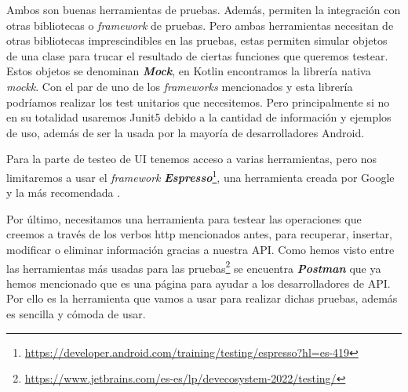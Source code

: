 Ambos son buenas herramientas de pruebas. Además, permiten la integración con otras bibliotecas o \textit{framework} de pruebas. Pero ambas herramientas necesitan de otras bibliotecas imprescindibles en las pruebas, estas permiten simular objetos de una clase para trucar el resultado de ciertas funciones que queremos testear. Estos objetos se denominan \textbf{\textit{Mock}}, en Kotlin encontramos la librería nativa \textit{mockk}. Con el par de uno de los \textit{frameworks} mencionados y esta librería podríamos realizar los test unitarios que necesitemos. Pero principalmente si no en su totalidad usaremos Junit5 debido a la cantidad de información y ejemplos de uso, además de ser la usada por la mayoría de desarrolladores Android.

Para la parte de testeo de UI tenemos acceso a varias herramientas, pero nos limitaremos a usar el \textit{framework} \textbf{\textit{Espresso}}\footnote{\url{https://developer.android.com/training/testing/espresso?hl=es-419}}, una herramienta creada por Google y la más recomendada \cite{UITest}.

Por último, necesitamos una herramienta para testear las operaciones que creemos a través de los verbos http mencionados antes, para  recuperar, insertar, modificar o eliminar información gracias a nuestra API. Como hemos visto entre las herramientas más usadas para las pruebas\footnote{\url{https://www.jetbrains.com/es-es/lp/devecosystem-2022/testing/}} se encuentra \textit{\textbf{Postman}} que ya hemos mencionado que es una página para ayudar a los desarrolladores de API. Por ello es la herramienta que vamos a usar para realizar dichas pruebas, además es sencilla y cómoda de usar.